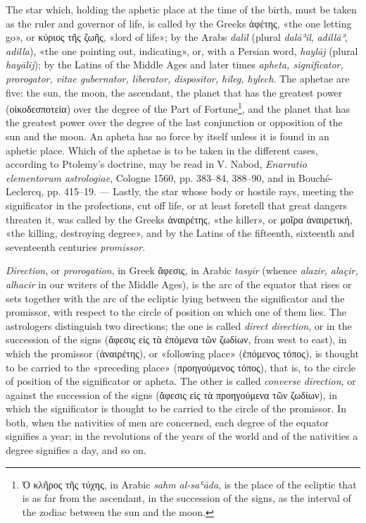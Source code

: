 \documentclass[11pt]{article}
\newcommand{\Pg}[1]{\marginpar{\footnotesize\color{gray}#1}}
\begin{document}
\par \Pg{I 314}The star which, holding the aphetic place at the time of the birth, must be taken as the ruler and governor of life, is called by the Greeks {\greekfont ἀφέτης}, «the one letting go», or {\greekfont κύριος τῆς ζωῆς}, «lord of life»; by the Arabs \emph{dalīl} (plural \emph{dalāʾil}, \emph{adillāʾ}, \emph{adilla}), «the one pointing out, indicating», or, with a Persian word, \emph{haylāj} (plural \emph{hayālij}); by the Latins of the Middle Ages and later times \emph{apheta, significator, prorogator, vitae gubernator, liberator, dispositor, hileg, hylech}. The aphetae are five: the sun, the moon, the ascendant, the planet that has the greatest power ({\greekfont οἰκοδεσποτεία}) over the degree of the Part of Fortune\footnote{{\greekfont Ὁ κλῆρος τῆς τύχης}, in Arabic \emph{sahm al-saʿāda}, is the place of the ecliptic that is as far from the ascendant, in the succession of the signs, as the interval of the zodiac between the sun and the moon.}, and the planet that has the greatest power over the degree of the last conjunction or opposition of the sun and the moon. An apheta has no force by itself unless it is found in an aphetic place. Which of the aphetae is to be taken in the different cases, according to Ptolemy's doctrine, may be read in V. Nabod, \emph{Enarratio elementorum astrologiae}, Cologne 1560, pp. 383–84, 388–90, and in Bouché-Leclercq, pp. 415–19. — Lastly, the star whose body or hostile rays, meeting the significator in the profections, cut off life, or at least foretell that great dangers threaten it, was called by the Greeks {\greekfont ἀναιρέτης}, «the killer», or {\greekfont μοῖρα ἀναιρετική}, «the killing, destroying degree», and by the Latins of the fifteenth, sixteenth and seventeenth centuries \emph{promissor}.\par
\par \emph{Direction}, or \emph{prorogation}, in Greek {\greekfont ἄφεσις}, in Arabic \emph{tasyīr} (whence \emph{alazir, alaçir, alhacir} in our writers of the Middle Ages), is the arc of the equator that rises or sets together with the arc of the ecliptic lying between the significator and the promissor, with respect to the circle of position on which one of them lies. The astrologers distinguish two directions; the one is called \emph{direct direction}, or in the succession of the signs ({\greekfont ἄφεσις εἰς τὰ ἑπόμενα τῶν ζωδίων}, from west to east), in which the promissor ({\greekfont ἀναιρέτης}), or «following place» ({\greekfont ἑπόμενος τόπος}), is thought to be carried to the «preceding place» ({\greekfont προηγούμενος τόπος}), that is, to the circle of position of the significator or apheta. The other is called \emph{converse direction}, or against the succession of the signs ({\greekfont ἄφεσις εἰς τὰ προηγούμενα τῶν ζωδίων}), in which the significator is thought to be carried to the circle of the promissor. In both, when the nativities of men are concerned, each degree of the equator signifies a year; in the revolutions of the years of the world and of the nativities a degree signifies a day, and so on.\par
\end{document}
